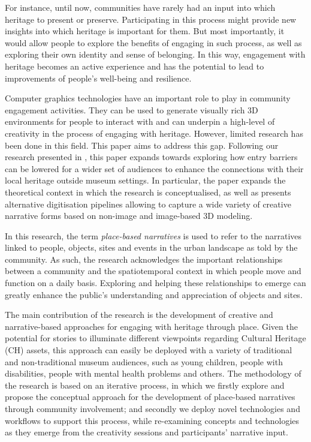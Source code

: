 \documentclass[acmlarge,screen,dvipsnames]{acmart}
\begin{document}
For instance, until now, communities have rarely had an input into which heritage to present or preserve. Participating in this process might provide new insights into which
heritage is important for them. But most importantly, it would allow people to explore the benefits of engaging in such process, as well as exploring their own identity and sense of belonging. In this way, engagement with heritage becomes an active experience and has the potential to lead to improvements of people's well-being and resilience. 

Computer graphics technologies have an important role to play in community engagement activities. They can be used to generate visually rich 3D environments for people to interact with and can underpin a high-level of creativity in the process of engaging with heritage. However, limited research has been done in this field.  This paper aims to address this gap. Following our research presented in \cite{6b8314fd76a64d3f86fd627505cc29e9}, this paper expands towards exploring how entry barriers can be lowered for a wider set of audiences to enhance the connections with their local heritage outside museum
settings. In particular, the paper expands the theoretical context in which the research is conceptualised, as well as presents alternative digitisation pipelines allowing to capture a wide variety of creative narrative forms based on non-image and image-based 3D modeling. 

In this research, the term \textit{place-based
narratives} is used to refer to the narratives linked to people, objects, sites and events in the urban landscape as told by the community. As such, the research acknowledges the important relationships between a community and the spatiotemporal context in which people move and function on a daily basis. Exploring and helping these relationships to emerge can greatly enhance the public's understanding and appreciation of objects and sites. 

The main contribution of the research is the development of creative and narrative-based
approaches for engaging with heritage through place. Given the potential for stories to illuminate different viewpoints regarding Cultural Heritage (CH) assets, this approach can easily be deployed with a variety of traditional and non-traditional museum audiences, such as young children, people with disabilities, people with mental health problems and others. The methodology of the research is based on an iterative process, in which we firstly explore and propose the conceptual approach for
the development of place-based narratives through community involvement; and
secondly we deploy novel technologies and workflows to support this process, while re-examining concepts and technologies as they emerge from the creativity sessions and participants' narrative input.
\end{document}
